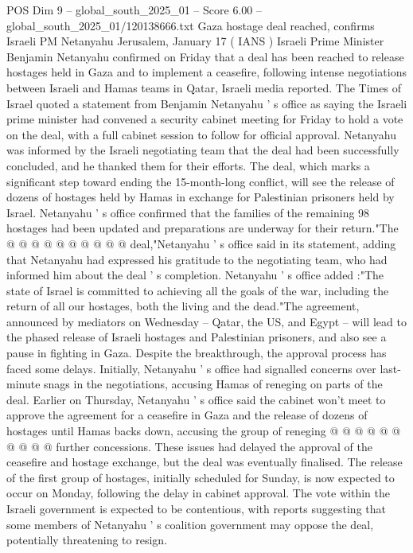 \begin{textsample}{POS Dim 9 – global\_south\_2025\_01 – Score 6.00 – global\_south\_2025\_01/120138666.txt}  \label{ex:f9_pos_342}
Gaza hostage deal reached, confirms Israeli PM Netanyahu Jerusalem, January 17 ( IANS ) Israeli Prime Minister Benjamin Netanyahu confirmed on Friday that a deal has been reached to release hostages held in Gaza and to implement a ceasefire, following intense negotiations between Israeli and Hamas teams in Qatar, Israeli media reported.
The Times of Israel quoted a statement from Benjamin Netanyahu ' s office as saying the Israeli prime minister had convened a security cabinet meeting for Friday to hold a vote on the deal, with a full cabinet session to follow for official approval.
Netanyahu was informed by the Israeli negotiating team that the deal had been successfully concluded, and he thanked them for their efforts.
The deal, which marks a significant step toward ending the 15-month-long conflict, will see the release of dozens of hostages held by Hamas in exchange for Palestinian prisoners held by Israel.
Netanyahu ' s office confirmed that the families of the remaining 98 hostages had been updated and preparations are underway for their return."The @ @ @ @ @ @ @ @ @ @ deal,"Netanyahu ' s office said in its statement, adding that Netanyahu had expressed his gratitude to the negotiating team, who had informed him about the deal ' s completion.
Netanyahu ' s office added :"The state of Israel is committed to achieving all the goals of the war, including the return of all our hostages, both the living and the dead."The agreement, announced by mediators on Wednesday -- Qatar, the US, and Egypt -- will lead to the phased release of Israeli hostages and Palestinian prisoners, and also see a pause in fighting in Gaza.
Despite the breakthrough, the approval process has faced some delays.
Initially, Netanyahu ' s office had signalled concerns over last-minute snags in the negotiations, accusing Hamas of reneging on parts of the deal.
Earlier on Thursday, Netanyahu ' s office said the cabinet won't meet to approve the agreement for a ceasefire in Gaza and the release of dozens of hostages until Hamas backs down, accusing the group of reneging @ @ @ @ @ @ @ @ @ @ further concessions.
These issues had delayed the approval of the ceasefire and hostage exchange, but the deal was eventually finalised.
The release of the first group of hostages, initially scheduled for Sunday, is now expected to occur on Monday, following the delay in cabinet approval.
The vote within the Israeli government is expected to be contentious, with reports suggesting that some members of Netanyahu ' s coalition government may oppose the deal, potentially threatening to resign.

\end{textsample}
